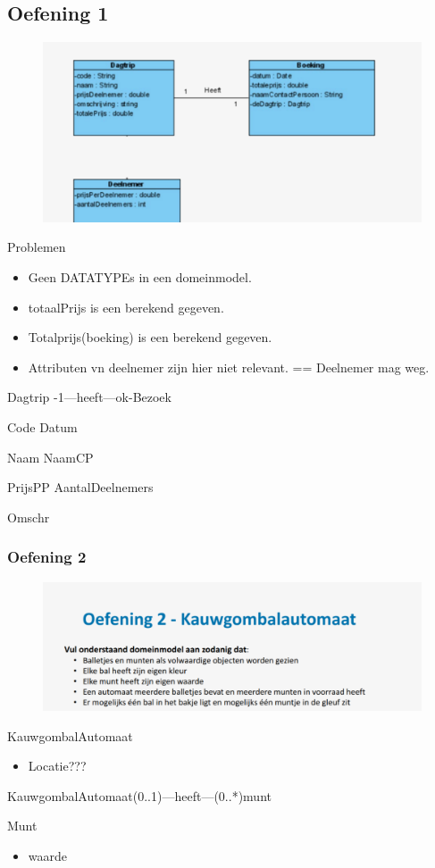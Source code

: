 \documentclass{article}
\begin{document}
\subsection{Oefening 1}
\begin{figure}[h]
  \includegraphics[width=0.6\linewidth]{oef1.png}
\end{figure}
Problemen
\begin{itemize}
\item Geen DATATYPEs in een domeinmodel. 
\item totaalPrijs is een berekend gegeven.
\item Totalprijs(boeking) is een berekend gegeven.
\item Attributen vn deelnemer zijn hier niet relevant. == Deelnemer mag weg.
\end{itemize}
Dagtrip -1---heeft---ok-Bezoek

Code			Datum

Naam			NaamCP

PrijsPP			AantalDeelnemers

Omschr
\subsubsection{Oefening 2}
\begin{figure}[h]
  \includegraphics[width=0.6\linewidth]{oef2.png}
\end{figure}

KauwgombalAutomaat
\begin{itemize}
	\item Locatie???
\end{itemize}

KauwgombalAutomaat(0..1)---heeft---(0..*)munt

Munt
\begin{itemize}
	\item waarde
\end{itemize}
\end{document}
